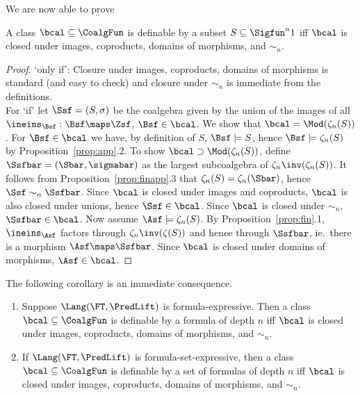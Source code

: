 \documentclass{entcs}
\begin{document}
We are now able to prove

\begin{thm}
  A class $\bcal\subseteq\CoalgFun$ is definable by a subset
  $S\subseteq\Sigfun^n 1$ iff $\bcal$ is closed under images, coproducts,
  domains of morphisms, and $\sim_n$.
\end{thm}

\begin{proof}
  `only if': Closure under images, coproducts, domains of morphisms is
  standard (and easy to check) and closure under $\sim_n$ is immediate
  from
  the definitions.\\ %
  For `if' let $\Ssf=(S,\sigma)$ be the coalgebra given by the union of the
  images of all $\ineins_\Bsf:\Bsf\maps\Zsf$, $\Bsf\in\bcal$.  We show that
  $\bcal=\Mod(\zeta_n(S))$.  For $\Bsf\in\bcal$ we have, by definition of
  $S$, $\Bsf\models S$, hence
  $\Bsf\models \zeta_n(S)$ by Proposition~\ref{prop:app}.2.
  To show $\bcal\supset\Mod(\zeta_n(S))$, define $\Ssfbar=(\Sbar,\sigmabar)$
  as the largest subcoalgebra of $\zeta_n\inv(\zeta_n(S))$. It follows from
  Proposition~\ref{prop:finapp}.3 that $\zeta_n(S)=\zeta_n(\Sbar)$,
  hence  $\Ssf\sim_n\Ssfbar$.
  Since $\bcal$ is closed under images and coproducts, $\bcal$ is also closed
  under unions, hence $\Ssf\in\bcal$.  Since $\bcal$ is closed under $\sim_n$,
  $\Ssfbar\in\bcal$. Now assume $\Asf\models \zeta_n(S)$. By
  Proposition~\ref{prop:fin}.1, $\ineins_\Asf$ factors through
  $\zeta_n\inv(\zeta(S))$ and hence through $\Ssfbar$, ie.\ there is a morphism
  $\Asf\maps\Ssfbar$.  Since $\bcal$ is closed under domains of morphisms,
  $\Asf\in\bcal$.
\end{proof}

The following corollary is an immediate consequence.

\begin{cor}
\begin{enumerate}
\item  Suppose $\Lang(\FT,\PredLift)$ is formula-expressive. Then
  a class
  $\bcal\subseteq\CoalgFun$ is definable by a formula of depth $n$ iff
  $\bcal$ is closed under images, coproducts, domains of morphisms,
  and $\sim_n$.
\item If $\Lang(\FT,\PredLift)$ is formula-set-expressive, then
  a class $\bcal \subseteq \CoalgFun$ is definable by a set
  of formulas of depth $n$ iff $\bcal$ is closed under images,
  coproducts, domains of morphisms, and $\sim_n$.
\end{enumerate}
\end{cor}
\end{document}

